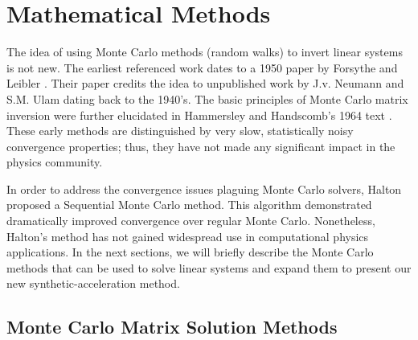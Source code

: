 \documentclass[preprint,12pt]{elsarticle}
\begin{document}
\section{Mathematical Methods}
\label{sec:monte-carlo-matrix}

The idea of using Monte Carlo methods (random walks) to invert linear systems
is not new.  The earliest referenced work dates to a 1950 paper by Forsythe
and Leibler \cite{forsythe}.  Their paper credits the idea to unpublished work
by J.v. Neumann and S.M. Ulam dating back to the 1940's.  The basic principles
of Monte Carlo matrix inversion were further elucidated in Hammersley and
Handscomb's 1964 text \cite{hammersley_1964}.  These early methods are
distinguished by very slow, statistically noisy convergence properties; thus,
they have not made any significant impact in the physics community.

In order to address the convergence issues plaguing Monte Carlo
solvers, Halton \cite{halton_1962,halton_1994} proposed a Sequential
Monte Carlo method.  This algorithm demonstrated dramatically improved
convergence over regular Monte Carlo.  Nonetheless, Halton's method
has not gained widespread use in computational physics
applications. In the next sections, we will briefly describe the Monte
Carlo methods that can be used to solve linear systems and expand them
to present our new synthetic-acceleration method.

\subsection{Monte Carlo Matrix Solution Methods}
\label{sec:background}
\end{document}
